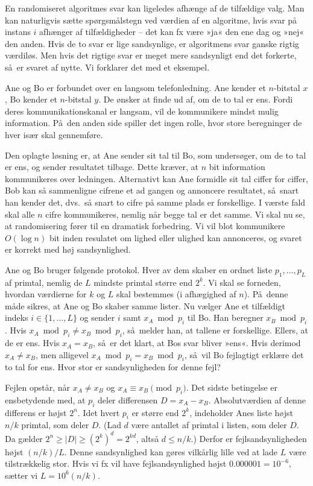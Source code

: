 En randomiseret algoritmes svar kan ligeledes afhænge af de tilfældige valg.
Man kan naturligvis sætte spørgsmålstegn ved værdien af en algoritme, hvis svar på instans $i$ afhænger af tilfældigheder -- det kan fx være »ja« den ene dag og »nej« den anden.
Hvis de to svar er lige sandsynlige, er algoritmens svar ganske rigtig værdiløs.
Men hvis det rigtige svar er meget mere sandsynligt end det forkerte, så er svaret af nytte.
Vi forklarer det med et eksempel.

Ane og Bo er forbundet over en langsom telefonledning. 
Ane kender et $n$-bitstal $x$, Bo kender et $n$-bitstal $y$.
De ønsker at finde ud af, om de to tal er ens.
Fordi deres kommunikationskanal er langsam, vil de kommunikere mindst mulig information.
På den anden side spiller det ingen rolle, hvor store beregninger de hver især skal gennemføre.

Den oplagte løsning er, at Ane sender sit tal til Bo, som undersøger, om de to tal er ens, og sender resultatet tilbage.
Dette kræver, at $n$ bit information kommunikeres over ledningen.
Alternativt kan Ane formidle sit tal ciffer for ciffer, Bob kan så sammenligne cifrene et ad gangen og annoncere resultatet, så snart han kender det, dvs.\ så snart to cifre på samme plads er forskellige.
I værste fald skal alle $n$ cifre kommunikeres, nemlig når begge tal er det samme.
Vi skal nu se, at randomisering fører til en dramatisk forbedring.
Vi vil blot kommunikere $O(\log n)$ bit inden resulatet om lighed eller ulighed kan annonceres, og svaret er korrekt med høj sandsynlighed.

Ane og Bo bruger følgende protokol.
Hver av dem skaber en ordnet liste $p_1,\ldots,p_L$ af primtal, nemlig de $L$ mindste primtal større end $2^k$.
Vi skal se forneden, hvordan værdierne for $k$ og $L$ skal bestemmes (i afhægighed af $n$).
På denne måde sikres, at Ane og Bo skaber samme lister.
Nu vælger Ane et tilfældigt indeks $i\in\{1,\ldots, L\}$ og sender $i$ samt $x_A \bmod p_i$ til Bo.
Han beregner $x_B \bmod p_i$. 
Hvis $x_A \bmod p_i \not= x_B \bmod p_i$, så melder han, at tallene er forskellige.
Ellers, at de er ens.
Hvis $x_A = x_B$, så er det klart, at Bos svar bliver »ens«.
Hvis derimod $x_A \not= x_B$, men alligevel  $x_A  \bmod p_i = x_B \bmod p_i$, så vil Bo fejlagtigt erklære det to tal for ens. 
Hvor stor er sandsynligheden for denne fejl?
  
Fejlen opstår, når $x_A \not= x_B$ og $x_A \equiv x_B \pmod{p_i}$.
Det sidste betingelse er ensbetydende med, at $p_i$ deler differensen $D = x_A - x_B$.
Absolutværdien af denne differens er højst $2^n$.
Idet hvert $p_i$ er større end  $2^k$, indeholder Anes liste højst $n/k$ primtal, som deler $D$.
(Lad $d$ være antallet af primtal i listen, som deler $D$. 
Da gælder $2^n \ge |D|  \ge (2^k)^d = 2^{kd}$, altså $d \le n/k$.)
Derfor er fejlsandsynligheden højst $(n/k)/L$.
Denne sandsynlighed kan gøres vilkårlig lille ved at lade $L$ være tilstrækkelig stor.
Hvis vi fx vil have fejlsandsynlighed højst $\num{0,000001} = 10^{-6}$, sætter vi $L=10^6 (n/k)$.


